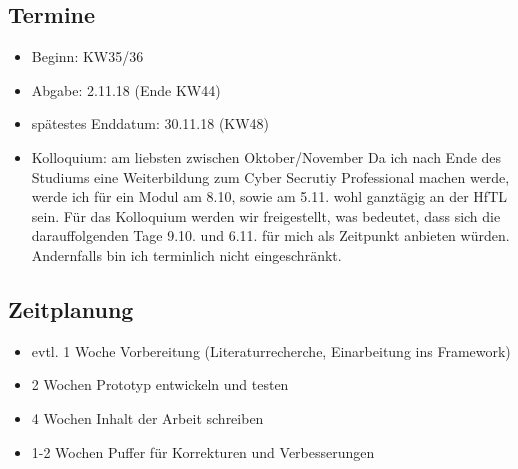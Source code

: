     \subsection*{Termine}
        \begin{itemize}
            \item Beginn: KW35/36
            \item Abgabe: 2.11.18 (Ende KW44)
            \item spätestes Enddatum: 30.11.18 (KW48)
            \item Kolloquium: am liebsten zwischen Oktober/November 
            Da ich nach Ende des Studiums eine Weiterbildung zum Cyber Secrutiy Professional machen werde, werde ich für ein Modul am 8.10, sowie am 5.11. wohl ganztägig an der HfTL sein. Für das Kolloquium werden wir freigestellt, was bedeutet, dass sich die darauffolgenden Tage 9.10. und 6.11. für mich als Zeitpunkt anbieten würden. Andernfalls bin ich terminlich nicht eingeschränkt.
        \end{itemize}
        
    \subsection*{Zeitplanung}
        \begin{itemize}
            \item evtl. 1 Woche Vorbereitung (Literaturrecherche, Einarbeitung ins Framework)
            \item 2 Wochen Prototyp entwickeln und testen
            \item 4 Wochen Inhalt der Arbeit schreiben
            \item 1-2 Wochen Puffer für Korrekturen und Verbesserungen
        \end{itemize}
        
